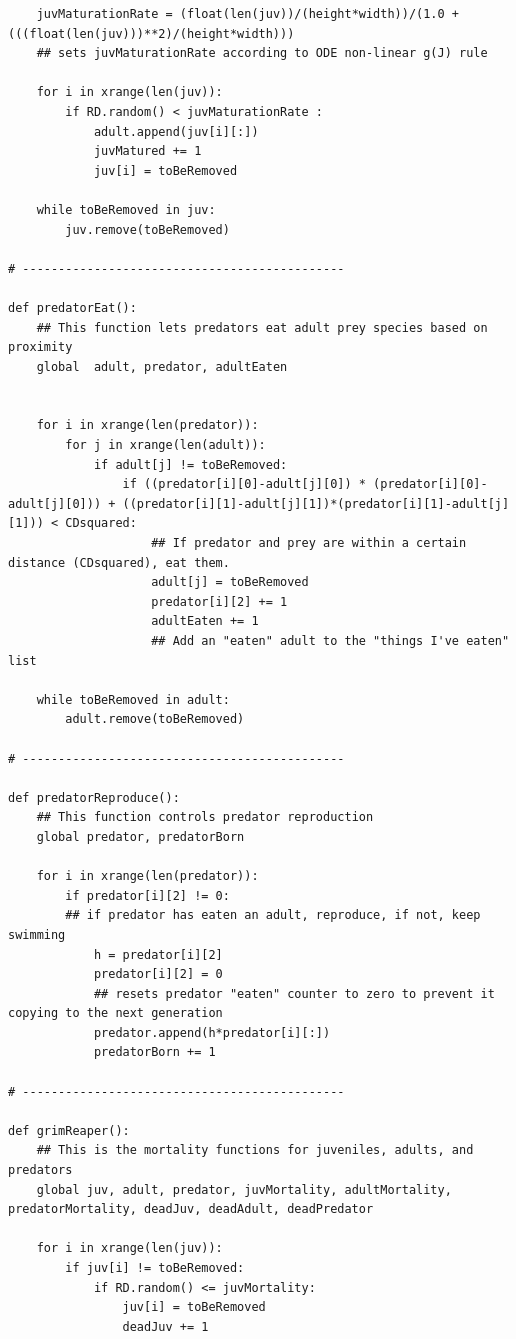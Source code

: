 \documentclass[12pt]{article}
\begin{document}
\begin{lstlisting}
    juvMaturationRate = (float(len(juv))/(height*width))/(1.0 + (((float(len(juv)))**2)/(height*width)))
    ## sets juvMaturationRate according to ODE non-linear g(J) rule
    
    for i in xrange(len(juv)):
        if RD.random() < juvMaturationRate :
            adult.append(juv[i][:])
            juvMatured += 1
            juv[i] = toBeRemoved

    while toBeRemoved in juv:
        juv.remove(toBeRemoved)

# ---------------------------------------------

def predatorEat():
    ## This function lets predators eat adult prey species based on proximity
    global  adult, predator, adultEaten
    

    for i in xrange(len(predator)):
        for j in xrange(len(adult)):
            if adult[j] != toBeRemoved:
                if ((predator[i][0]-adult[j][0]) * (predator[i][0]-adult[j][0])) + ((predator[i][1]-adult[j][1])*(predator[i][1]-adult[j][1])) < CDsquared:
                    ## If predator and prey are within a certain distance (CDsquared), eat them.
                    adult[j] = toBeRemoved
                    predator[i][2] += 1
                    adultEaten += 1
                    ## Add an "eaten" adult to the "things I've eaten" list

    while toBeRemoved in adult:
        adult.remove(toBeRemoved)

# ---------------------------------------------

def predatorReproduce():
    ## This function controls predator reproduction
    global predator, predatorBorn

    for i in xrange(len(predator)):
        if predator[i][2] != 0:
        ## if predator has eaten an adult, reproduce, if not, keep swimming 
            h = predator[i][2]
            predator[i][2] = 0
            ## resets predator "eaten" counter to zero to prevent it copying to the next generation
            predator.append(h*predator[i][:])
            predatorBorn += 1

# ---------------------------------------------
    
def grimReaper():
    ## This is the mortality functions for juveniles, adults, and predators
    global juv, adult, predator, juvMortality, adultMortality, predatorMortality, deadJuv, deadAdult, deadPredator

    for i in xrange(len(juv)):
        if juv[i] != toBeRemoved:
            if RD.random() <= juvMortality:
                juv[i] = toBeRemoved
                deadJuv += 1



\end{lstlisting}
\end{document}
